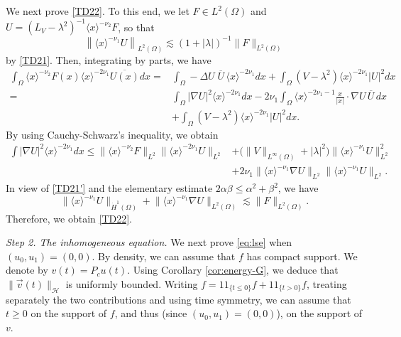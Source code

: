 \documentclass[10pt,leqno]{amsart}
\theoremstyle{definition}%
\theoremstyle{remark}
\numberwithin{equation}{section}
\newcommand{\indic}{1\!\!1}
\renewcommand{\^}{\widehat}%
\newcommand{\HHH}{\mathcal{H}}
\begin{document}
	We next prove \eqref{TD22}.
	To this end, we let $F\in L^2(\Omega)$ and $U=(L_V-\lambda^2)^{-1}\langle x\rangle^{-\nu_2} F$, so that 
	\begin{equation}
	 \label{TD21'}
	 \left\|\langle x\rangle^{-\nu_1} U\right\|_{L^2(\Omega)}\lesssim (1+|\lambda|)^{-1}\|F\|_{L^2(\Omega)}
	\end{equation} 
	by \eqref{TD21}.
	Then, integrating by parts, we have
	\begin{align*}
	\int_{\Omega}\langle x\rangle^{-\nu_2}F(x)\langle x\rangle^{-2\nu_1}\overline{U(x)}dx
	=&\int_{\Omega}-\Delta U\;\overline{U}\,\langle x\rangle^{-2\nu_1}dx+\int_{\Omega}(V-\lambda^2)\langle x\rangle^{-2\nu_1}\lvert U\rvert^2dx\\
	=&\int_{\Omega}\lvert\nabla U\rvert^2\langle x\rangle^{-2\nu_1}dx-2\nu_1\int_{\Omega}\langle x\rangle^{-2\nu_1-1}\frac{x}{\lvert x\rvert}\cdot \nabla U\,\overline{U}\,dx\\
	&+\int_{\Omega}(V-\lambda^2)\langle x\rangle^{-2\nu_1}\lvert U\rvert^2dx.
	\end{align*}
	By using Cauchy-Schwarz's inequality, we obtain
	\begin{align*}
	\int \lvert\nabla U\rvert^2\langle x\rangle^{-2\nu_1}dx\le \lVert\langle x\rangle^{-\nu_2}F \rVert_{L^2}\lVert\langle x\rangle^{-2\nu_1}U \rVert_{L^2}&+\bigl(\|V\|_{L^\infty(\Omega)}+|\lambda|^2\bigr)\lVert\langle x\rangle^{-\nu_1} U \rVert_{L^2}^2\\
	&+2\nu_1\lVert \langle x\rangle^{-\nu_1}\nabla U\rVert_{L^2}\lVert \langle x\rangle^{-\nu_1} U\rVert_{L^2}.
	\end{align*}
	In view of \eqref{TD21'} and the elementary estimate $2\alpha\beta\le\alpha^2+\beta^2$, we have 
	\begin{equation}
	\lVert \langle x\rangle^{-\nu_1}  U\rVert_{\dot{H}^1(\Omega)}+
	\lVert \langle x\rangle^{-\nu_1} \nabla U\rVert_{L^2(\Omega)}\lesssim \lVert F\rVert_{L^2(\Omega)}.
	\end{equation}
	Therefore, we obtain \eqref{TD22}. 

	
	\smallskip
	
	\noindent\emph{Step 2. The inhomogeneous equation.} We next prove \eqref{eq:lse} when $(u_0,u_1)=(0,0)$. By density, we can assume that $f$ has compact support. We denote by $v(t)=P_cu(t)$.
	Using Corollary \ref{cor:energy-G}, we deduce that $\|\vec{v}(t)\|_{\HHH}$ is uniformly bounded. 
	Writing $f=\indic_{\{t\leq 0\}} f+\indic_{\{t>0\}}f$, treating separately the two contributions and using time symmetry, we can assume that $t\geq 0$ on the support of $f$, and thus (since $(u_0,u_1)=(0,0)$), on the support of $v$.
	
\end{document}
